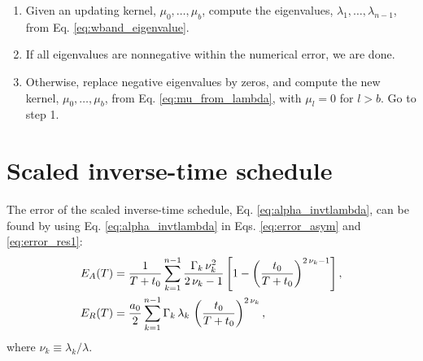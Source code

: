 \documentclass[reprint, floatfix]{revtex4-1}
\newcommand{\Err}{E}
\begin{document}
%
\begin{enumerate}
  \item
    Given an updating kernel, $\mu_0, \dots, \mu_b$,
    compute the eigenvalues,
    $\lambda_1, \dots, \lambda_{n-1}$,
    from Eq. \eqref{eq:wband_eigenvalue}.
  \item
    If all eigenvalues are nonnegative within the numerical error,
    we are done. %
  \item
    Otherwise, replace negative eigenvalues by zeros,
    and compute the new kernel,
    $\mu_0, \dots, \mu_b$, from
    Eq. \eqref{eq:mu_from_lambda},
    with $\mu_l = 0$ for $l > b$.
    Go to step 1.
\end{enumerate}











\section{\label{sec:sinvt_schedule}
Scaled inverse-time schedule}



The error of the scaled inverse-time schedule,
Eq. \eqref{eq:alpha_invtlambda},
can be found by using Eq. \eqref{eq:alpha_invtlambda}
in Eqs. \eqref{eq:error_asym} and \eqref{eq:error_res1}:
%
\begin{align}
  \Err_A(T)
  &=
  \frac{    1    }
       { T + t_0 }
  \sum_{k = 1}^{n-1}
    \frac{ \Gamma_k \, \nu_k^2 }
         {    2 \, \nu_k - 1   }
  \left[
    1 - \left(
          \frac {     t_0 }
                { T + t_0 }
        \right)^{ 2 \, \nu_k - 1 }
  \right]
  ,
  \notag
  \\
  \Err_R(T)
  &=
  \frac { a_0 } { 2 }
  \sum_{k = 1}^{n-1}
  \Gamma_k \, \lambda_k \,
  \left(
      \frac{   t_0   }
           { T + t_0 }
  \right)^{ 2 \, \nu_k }
  ,
  \notag
\end{align}
%
where $\nu_k \equiv \lambda_k / \lambda$.
%
%
%
\end{document}
